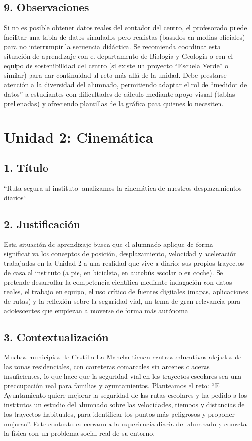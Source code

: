 \documentclass[11pt,a4paper]{article}
\begin{document}
\subsection*{9. Observaciones}
Si no es posible obtener datos reales del contador del centro, el profesorado puede facilitar una tabla de datos simulados pero realistas (basados en medias oficiales) para no interrumpir la secuencia didáctica. Se recomienda coordinar esta situación de aprendizaje con el departamento de Biología y Geología o con el equipo de sostenibilidad del centro (si existe un proyecto ``Escuela Verde'' o similar) para dar continuidad al reto más allá de la unidad. Debe prestarse atención a la diversidad del alumnado, permitiendo adaptar el rol de ``medidor de datos'' a estudiantes con dificultades de cálculo mediante apoyo visual (tablas prellenadas) y ofreciendo plantillas de la gráfica para quienes lo necesiten.

\newpage
\section{Unidad 2: Cinemática}
\subsection*{1. Título}
``Ruta segura al instituto: analizamos la cinemática de nuestros desplazamientos diarios''

\subsection*{2. Justificación}
Esta situación de aprendizaje busca que el alumnado aplique de forma significativa los conceptos de posición, desplazamiento, velocidad y aceleración trabajados en la Unidad 2 a una realidad que vive a diario: sus propios trayectos de casa al instituto (a pie, en bicicleta, en autobús escolar o en coche). Se pretende desarrollar la competencia científica mediante indagación con datos reales, el trabajo en equipo, el uso crítico de fuentes digitales (mapas, aplicaciones de rutas) y la reflexión sobre la seguridad vial, un tema de gran relevancia para adolescentes que empiezan a moverse de forma más autónoma.

\subsection*{3. Contextualización}
Muchos municipios de Castilla-La Mancha tienen centros educativos alejados de las zonas residenciales, con carreteras comarcales sin arcenes o aceras insuficientes, lo que hace que la seguridad vial en los trayectos escolares sea una preocupación real para familias y ayuntamientos. Planteamos el reto: ``El Ayuntamiento quiere mejorar la seguridad de las rutas escolares y ha pedido a los institutos un estudio del alumnado sobre las velocidades, tiempos y distancias de los trayectos habituales, para identificar los puntos más peligrosos y proponer mejoras''. Este contexto es cercano a la experiencia diaria del alumnado y conecta la física con un problema social real de su entorno.
\end{document}
